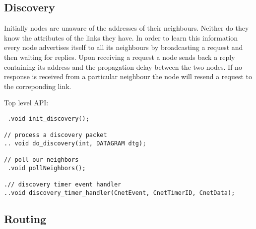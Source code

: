\documentclass[11pt,a4paper,oneside]{report}
\begin{document}
\subsection*{Discovery}
Initially nodes are unaware of the addresses of their neighbours. Neither do they know the
attributes of the links they have. In order to learn this information every node advertises
itself to all its neighbours by broadcasting a request and then waiting for replies. Upon receiving 
a request a node sends back a reply containing its address and the propagation delay between the
two nodes. If no response is received from a particular neighbour the node will resend a request to the 
correponding link. 
    
Top level API: 
\begin{lstlisting}
 .void init_discovery();

// process a discovery packet
.. void do_discovery(int, DATAGRAM dtg);

// poll our neighbors
 .void pollNeighbors();

.// discovery timer event handler
..void discovery_timer_handler(CnetEvent, CnetTimerID, CnetData);
\end{lstlisting}
\subsection*{Routing}
\end{document}
